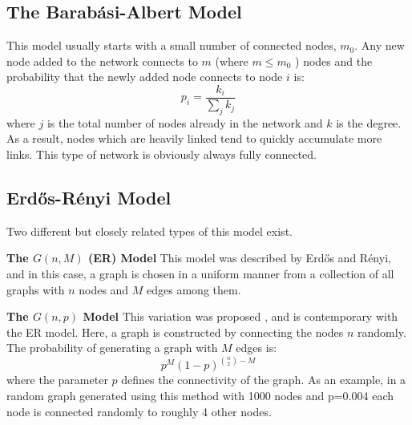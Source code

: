 \subsection{The Barab{\'a}si-Albert Model}

This model usually starts with a small number of connected nodes,
$m_0$.  Any new node added to the network connects to $m$ (where $m
\leq m_0$ ) nodes and the probability that the newly added node
connects to node $i$ is:
\begin{equation}
  \label{eq:ba_nw}
  p_i = \frac{k_i}{\sum_j k_j}
\end{equation}
where $j$ is the total number of nodes already in the network and $k$ is the degree.
As a result, nodes which are heavily linked tend to quickly accumulate more links.
This type of network is obviously always fully connected.

\subsection{Erd{\H{o}}s-R{\'e}nyi Model}


Two different but closely related types of this model exist. 

\textbf{The $G(n, M)$ (ER) Model} This model was described by Erd{\H{o}}s and R{\'e}nyi,
and in this case, a graph is chosen in a uniform manner from a collection of all
graphs with $n$ nodes and $M$ edges among them. 

\textbf{The $G(n, p)$ Model} This variation was proposed \citet{article:gilber}, and is
contemporary with the ER model. Here, a graph is constructed by connecting the nodes $n$
randomly. The probability of generating a graph with $M$ edges is:
\begin{equation}
  \label{eq:er}
  p^{M}(1-p)^{\binom{n}{2}-M}
\end{equation}
where the parameter $p$ defines the connectivity of the graph. As an example,
in a random graph generated using this method with 1000 nodes and p=0.004 each node
is connected randomly to roughly 4 other nodes. 